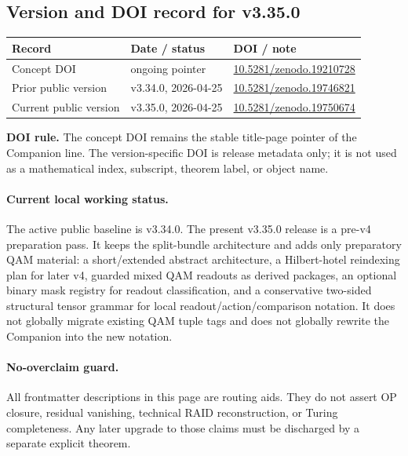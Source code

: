 \subsection*{Version and DOI record for v3.35.0}
\label{subsec:v3350-version-doi-record}

\begin{center}
\small
\begin{tabular}{>{\raggedright\arraybackslash}p{} >{\raggedright\arraybackslash}p{} >{\raggedright\arraybackslash}p{}}
\toprule
\textbf{Record} & \textbf{Date / status} & \textbf{DOI / note}\\
\midrule
Concept DOI & ongoing pointer & \href{https://doi.org/10.5281/zenodo.19210728}{10.5281/zenodo.19210728}\\
Prior public version & v3.34.0, 2026-04-25 & \href{https://doi.org/10.5281/zenodo.19746821}{10.5281/zenodo.19746821}\\
Current public version & v3.35.0, 2026-04-25 & \href{https://doi.org/10.5281/zenodo.19750674}{10.5281/zenodo.19750674}\\
\bottomrule
\end{tabular}
\end{center}

\noindent\textbf{DOI rule.} The concept DOI remains the stable title-page pointer of the Companion line. The version-specific DOI is release metadata only; it is not used as a mathematical index, subscript, theorem label, or object name.

\paragraph{Current local working status.}
The active public baseline is v3.34.0. The present v3.35.0 release is a pre-v4 preparation pass. It keeps the split-bundle architecture and adds only preparatory QAM material: a short/extended abstract architecture, a Hilbert-hotel reindexing plan for later v4, guarded mixed QAM readouts as derived packages, an optional binary mask registry for readout classification, and a conservative two-sided structural tensor grammar for local readout/action/comparison notation. It does not globally migrate existing QAM tuple tags and does not globally rewrite the Companion into the new notation.

\paragraph{No-overclaim guard.}
All frontmatter descriptions in this page are routing aids. They do not assert OP closure, residual vanishing, technical RAID reconstruction, or Turing completeness. Any later upgrade to those claims must be discharged by a separate explicit theorem.


